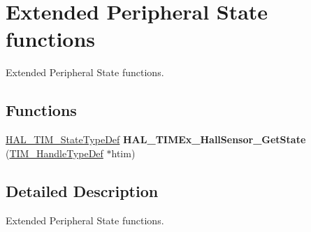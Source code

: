 \hypertarget{group___t_i_m_ex___exported___functions___group7}{}\section{Extended Peripheral State functions}
\label{group___t_i_m_ex___exported___functions___group7}


Extended Peripheral State functions.  


\subsection*{Functions}
\begin{DoxyCompactItemize}
\item 
\mbox{\label{group___t_i_m_ex___exported___functions___group7_ga69d56afa939909717370413d35311dbd}} 
\mbox{\hyperlink{group___t_i_m___exported___types_gae0994cf5970e56ca4903e9151f40010c}{H\+A\+L\+\_\+\+T\+I\+M\+\_\+\+State\+Type\+Def}} {\bfseries H\+A\+L\+\_\+\+T\+I\+M\+Ex\+\_\+\+Hall\+Sensor\+\_\+\+Get\+State} (\mbox{\hyperlink{struct_t_i_m___handle_type_def}{T\+I\+M\+\_\+\+Handle\+Type\+Def}} $\ast$htim)
\end{DoxyCompactItemize}


\subsection{Detailed Description}
Extended Peripheral State functions. 

